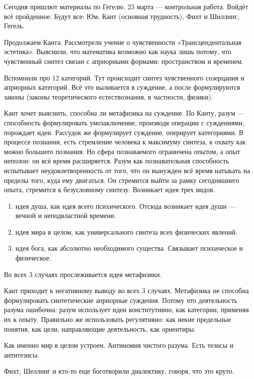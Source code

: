 
Сегодня пришлют материалы по Гегелю.
23 марта --- контрольная работа. Войдёт всё пройденное. Будут все: Юм, Кант (основная трудность), Фихт и Шиллинг, Гегель.

Продолжаем Канта. Рассмотрели учение о чувственности «Трансцендентальная эстетика». Выяснили, что математика возможно как наука лишь потому, что чувственный синтез связан с априорными формами: пространством и временем.

Вспомнили про 12 категорий. Тут происходит синтез чувственного созерцания и априорных категорий. Всё это выливается в суждение, а после формулируются законы (законы теоретического естествознания, в частности, физики).

Кант хочет выяснить, способна ли метафизика на суждение. По Канту, разум --- способность формулировать умозаключение, производя операции с суждениями, порождает идеи. Рассудок же формулирует суждение, оперирует категориями.
В процессе познания, есть стремление человека к максимуму синтеза, к охвату как можно большего познания. Но сфера познаваемого ограничена опытом, а опыт неполон: он всё время расширяется.
Разум как познавательная способность испытывает неудовлетворенность от того, что он вынужден всё время натыкать на пределы того, куда ему двигаться. Он стремится выйти за рамку сегодняшнего опыта, стремится к безусловному синтезу.
Возникает идея трех видов.
\begin{enumerate}
	\item идея душа, как идея всего психического. Отсюда возникает идея души --- вечной и неподвластной времени.
	\item идея мира в целом, как универсального синтеза всех физических явлений.
	\item идея бога, как абсолютно необходимого существа. Связывает психическое и физическое.
\end{enumerate}
Во всех 3 случаях прослеживается идея метафизики.

Кант приходит к негативному выводу во всех 3 случаях. Метафизика не способна формулировать синтетические априорные суждения. Потому что деятельность разума ошибочна: разум использует идеи конститутивно, как категории, применяя их к опыту. Правильно же использовать регулятивно: как некие предельные понятия, как цели, направляющие деятельность, как ориентиры.

Как именно мир в целом устроен. Антиномия чистого разума. Есть тезисы и антитезисы.

Фихт, Шеллинг и кто-то еще боготворили диалектику, говоря, что это круто.

